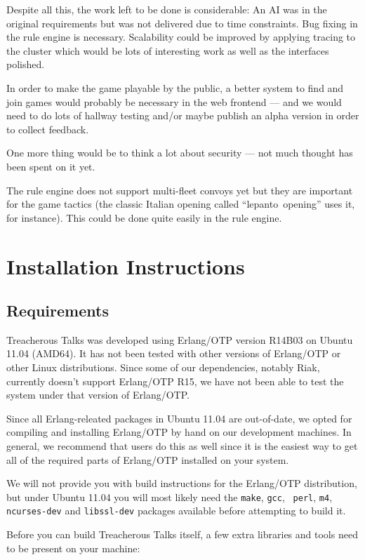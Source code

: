 \documentclass[11pt,a4paper]{report}
\begin{document}
Despite all this, the work left to be done is considerable:
An AI was in the original requirements but was not delivered due to time
constraints.
Bug fixing in the rule engine is necessary. Scalability could be improved by
applying tracing to the cluster which would be lots of interesting work as well
as the interfaces polished.

In order to make the game playable by the public, a better system to find and
join games would probably be necessary in the web frontend --- and we would
need to do lots of hallway testing and/or maybe publish an alpha version in
order to collect feedback.

One more thing would be to think a lot about security --- not much thought has
been spent on it yet.

The rule engine does not support multi-fleet convoys yet but they are important
for the game tactics (the classic Italian opening called ``lepanto~opening''
uses it, for instance). This could be done quite easily in the rule engine.

\appendix
\chapter{Installation Instructions}
\section{Requirements}
Treacherous Talks was developed using Erlang/OTP version R14B03 on Ubuntu 11.04
(AMD64). It has not been tested with other versions of Erlang/OTP or other Linux
distributions. Since some of our dependencies, notably Riak, currently doesn't
support Erlang/OTP R15, we have not been able to test the system under that
version of Erlang/OTP.

Since all Erlang-releated packages in Ubuntu 11.04 are out-of-date, we opted for
compiling and installing Erlang/OTP by hand on our development machines. In
general, we recommend that users do this as well since it is the easiest way to
get all of the required parts of Erlang/OTP installed on your system.

We will not provide you with build instructions for the Erlang/OTP distribution,
but under Ubuntu 11.04 you will most likely need the {\tt make}, {\tt gcc}, {\tt
  perl}, {\tt m4}, {\tt ncurses-dev} and {\tt libssl-dev} packages available
before attempting to build it.

Before you can build Treacherous Talks itself, a few extra libraries and tools
need to be present on your machine: \\
\end{document}

